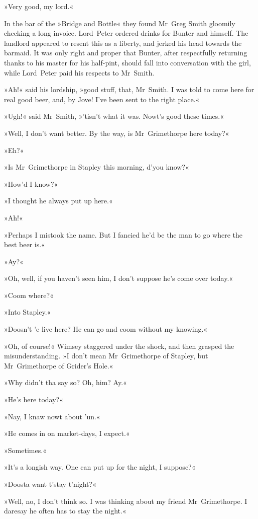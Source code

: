 »Very good, my lord.«

In the bar of the »Bridge and Bottle« they found Mr~Greg Smith gloomily checking a long invoice. Lord~Peter ordered drinks for Bunter and himself. The landlord appeared to resent this as a liberty, and jerked his head towards the barmaid. It was only right and proper that Bunter, after respectfully returning thanks to his master for his half-pint, should fall into conversation with the girl, while Lord~Peter paid his respects to Mr~Smith.

»Ah!« said his lordship, »good stuff, that, Mr~Smith. I was told to come here for real good beer, and, by Jove! I've been sent to the right place.«

»Ugh!« said Mr~Smith, »'tisn't what it was. Nowt's good these times.«

»Well, I don't want better. By the way, is Mr~Grimethorpe here today?«

»Eh?«

»Is Mr~Grimethorpe in Stapley this morning, d'you know?«

»How'd I know?«

»I thought he always put up here.«

»Ah!«

»Perhaps I mistook the name. But I fancied he'd be the man to go where the best beer is.«

»Ay?«

»Oh, well, if you haven't seen him, I don't suppose he's come over today.«

»Coom where?«

»Into Stapley.«

»Doosn't 'e live here? He can go and coom without my knowing.«

»Oh, of course!« Wimsey staggered under the shock, and then grasped the misunderstanding. »I don't mean Mr~Grimethorpe of Stapley, but Mr~Grimethorpe of Grider's Hole.«

»Why didn't tha say so? Oh, him? Ay.«

»He's here today?«

»Nay, I knaw nowt about 'un.«

»He comes in on market-days, I expect.«

»Sometimes.«

»It's a longish way. One can put up for the night, I suppose?«

»Doosta want t'stay t'night?«

»Well, no, I don't think so. I was thinking about my friend Mr~Grimethorpe. I daresay he often has to stay the night.«

